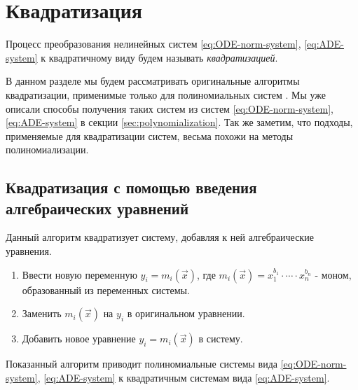 
\section{Квадратизация} \label{sec:quadratiaztion}

\begin{definition}
    Процесс преобразования нелинейных систем \eqref{eq:ODE-norm-system}, \eqref{eq:ADE-system} к квадратичному виду будем называть \textit{квадратизацией}.
\end{definition}

В данном разделе мы будем рассматривать оригинальные алгоритмы квадратизации, применимые только для  полиномиальных систем \cite{Gu-PhD}. Мы уже описали способы получения таких систем из систем \eqref{eq:ODE-norm-system}, \eqref{eq:ADE-system} в секции \ref{sec:polynomialization}. Так же заметим, что подходы, применяемые для квадратизации систем, весьма похожи на методы полиномиализации.

\subsection{Квадратизация с помощью введения алгебраических уравнений} \label{sec:quad-algebraic}

Данный алгоритм квадратизует систему, добавляя к ней алгебраические уравнения.

\begin{enumerate}
    \item Ввести новую переменную $y_i = m_i(\vec x)$, где $m_i(\vec x) = x_1^{b_1}\cdot \cdots \cdot x_n^{b_n}$ - моном, образованный из переменных системы.
    \item Заменить $m_i(\vec x)$ на $y_i$ в оригинальном уравнении.
    \item Добавить новое уравнение $y_i = m_i(\vec x)$ в систему.
\end{enumerate}

Показанный алгоритм приводит полиномиальные системы вида \eqref{eq:ODE-norm-system}, \eqref{eq:ADE-system} к квадратичным системам вида \eqref{eq:ADE-system}.

